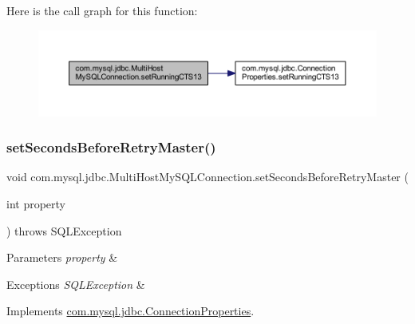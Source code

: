Here is the call graph for this function\+:
\nopagebreak
\begin{figure}[H]
\begin{center}
\leavevmode
\includegraphics[width=350pt]{classcom_1_1mysql_1_1jdbc_1_1_multi_host_my_s_q_l_connection_a10d268ef01a38535c6b99a9d038bb0db_cgraph}
\end{center}
\end{figure}
\mbox{\label{classcom_1_1mysql_1_1jdbc_1_1_multi_host_my_s_q_l_connection_a7604c2e4bfbbb42ec5ce170e86970ef3}} 
\subsubsection{\texorpdfstring{set\+Seconds\+Before\+Retry\+Master()}{setSecondsBeforeRetryMaster()}}
{\footnotesize\ttfamily void com.\+mysql.\+jdbc.\+Multi\+Host\+My\+S\+Q\+L\+Connection.\+set\+Seconds\+Before\+Retry\+Master (\begin{DoxyParamCaption}\item[{int}]{property }\end{DoxyParamCaption}) throws S\+Q\+L\+Exception}


\begin{DoxyParams}{Parameters}
{\em property} & \\
\hline
\end{DoxyParams}

\begin{DoxyExceptions}{Exceptions}
{\em S\+Q\+L\+Exception} & \\
\hline
\end{DoxyExceptions}


Implements \mbox{\hyperlink{interfacecom_1_1mysql_1_1jdbc_1_1_connection_properties_aebbbaaab658a9df1fd2af21e9c3ccbf5}{com.\+mysql.\+jdbc.\+Connection\+Properties}}.

